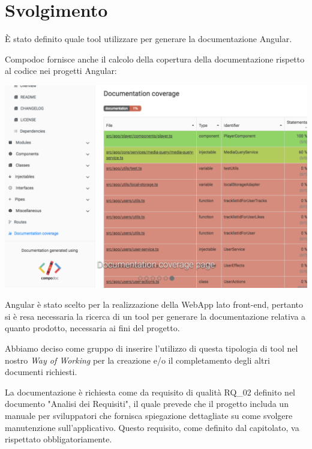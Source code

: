 \section{Svolgimento}

È stato definito quale tool utilizzare per generare la documentazione Angular.

Compodoc fornisce anche il calcolo della copertura della documentazione rispetto al codice nei progetti Angular:

\includegraphics[width = 0.9\linewidth]{img/compodoc.png}

Angular è stato scelto per la realizzazione della WebApp lato front-end, pertanto si è resa necessaria la ricerca di un tool per generare la documentazione relativa a quanto prodotto, necessaria ai fini del progetto.

Abbiamo deciso come gruppo di inserire l'utilizzo di questa tipologia di tool nel nostro {\it{Way of Working}} per la creazione e/o il completamento degli altri documenti richiesti.

La documentazione è richiesta come da requisito di qualità RQ_02 definito nel documento "Analisi dei Requisiti", il quale prevede che il progetto includa un manuale per sviluppatori che fornisca spiegazione dettagliate su come svolgere manutenzione sull'applicativo. Questo requisito, come definito dal capitolato, va rispettato obbligatoriamente.
